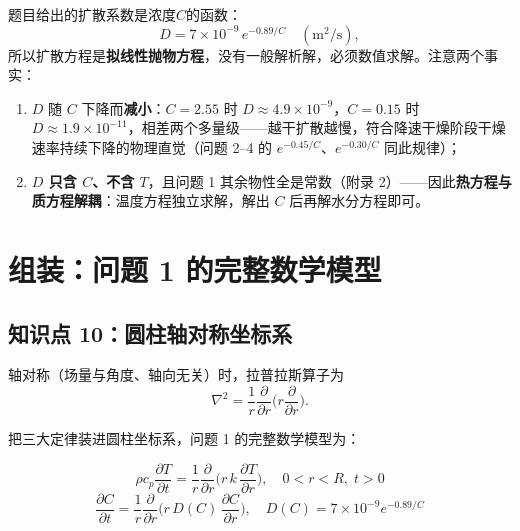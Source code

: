 \documentclass[12pt,a4paper]{ctexart}
\begin{document}
题目给出的扩散系数是浓度$C$的函数：
\begin{equation}
D=7\times10^{-9}\,e^{-0.89/C}\quad (\text{m}^2/\text{s}),
\label{eq:D1}
\end{equation}
所以扩散方程是\textbf{拟线性抛物方程}，没有一般解析解，必须数值求解。注意两个事实：

\begin{enumerate}[leftmargin=2.5em]
\item $D$ 随 $C$ 下降而\textbf{减小}：$C=2.55$ 时 $D\approx4.9\times10^{-9}$，$C=0.15$ 时 $D\approx1.9\times10^{-11}$，相差两个多量级——越干扩散越慢，符合降速干燥阶段干燥速率持续下降的物理直觉（问题 2--4 的 $e^{-0.45/C}$、$e^{-0.30/C}$ 同此规律）；
\item \textbf{$D$ 只含 $C$、不含 $T$}，且问题 1 其余物性全是常数（附录 2）——因此\textbf{热方程与质方程解耦}：温度方程独立求解，解出 $C$ 后再解水分方程即可。
\end{enumerate}

\begin{center}
\end{center}

\section{组装：问题 1 的完整数学模型}

\subsection{知识点 10：圆柱轴对称坐标系}

轴对称（场量与角度、轴向无关）时，拉普拉斯算子为
\begin{equation}
\nabla^2=\frac{1}{r}\frac{\partial}{\partial r}\bigg(r\frac{\partial}{\partial r}\bigg).
\end{equation}

把三大定律装进圆柱坐标系，问题 1 的完整数学模型为：

\begin{equation}
\boxed{\;\rho c_p\frac{\partial T}{\partial t}=\frac{1}{r}\frac{\partial}{\partial r}\bigg(r\,k\,\frac{\partial T}{\partial r}\bigg),\quad 0<r<R,\;t>0\;}
\label{eq:modelT}
\end{equation}
\begin{equation}
\boxed{\;\frac{\partial C}{\partial t}=\frac{1}{r}\frac{\partial}{\partial r}\bigg(r\,D(C)\,\frac{\partial C}{\partial r}\bigg),\quad D(C)=7\times10^{-9}e^{-0.89/C}\;}
\label{eq:modelC}
\end{equation}
\end{document}
